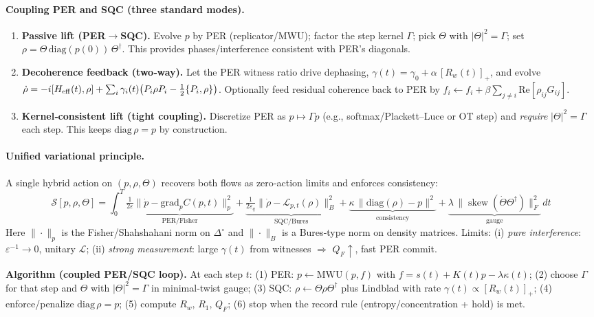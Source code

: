 \documentclass[11pt]{article}
\begin{document}
\paragraph{Coupling PER and SQC (three standard modes).}
\begin{enumerate}[leftmargin=1.05em,itemsep=2pt,topsep=2pt]
\item \textbf{Passive lift (PER$\rightarrow$SQC).} Evolve $p$ by PER (replicator/MWU); factor the step kernel $\Gamma$; pick $\Theta$ with $|\Theta|^2=\Gamma$; set $\rho=\Theta\,\mathrm{diag}(p(0))\,\Theta^\dagger$. This provides phases/interference consistent with PER’s diagonals.
\item \textbf{Decoherence feedback (two‑way).} Let the PER witness ratio drive dephasing,
$\gamma(t)=\gamma_0+\alpha\,[R_w(t)]_+$,
and evolve
$\dot\rho=-i[H_{\rm eff}(t),\rho]+\sum_i\gamma_i(t)\big(P_i\rho P_i-\tfrac12\{P_i,\rho\}\big)$.
Optionally feed residual coherence back to PER by $f_i \leftarrow f_i + \beta \sum_{j\ne i}\mathrm{Re}[\rho_{ij}G_{ij}]$.
\item \textbf{Kernel‑consistent lift (tight coupling).} Discretize PER as $p\mapsto \Gamma p$ (e.g., softmax/Plackett–Luce or OT step) and \emph{require} $|\Theta|^2=\Gamma$ each step. This keeps $\mathrm{diag}\,\rho=p$ by construction.
\end{enumerate}

\paragraph{Unified variational principle.}
A single hybrid action on $(p,\rho,\Theta)$ recovers both flows as zero‑action limits and enforces consistency:
\[
\boxed{\;
\mathcal{S}[p,\rho,\Theta]=\!\int_0^T
\underbrace{\tfrac{1}{2\varepsilon}\big\|\dot p-\mathrm{grad}_p C(p,t)\big\|_{p}^{2}}_{\text{PER/Fisher}}
+\underbrace{\tfrac{1}{2\varepsilon_q}\big\|\dot\rho-\mathcal{L}_{p,t}(\rho)\big\|_{B}^{2}}_{\text{SQC/Bures}}
+\underbrace{\kappa\,\|\mathrm{diag}(\rho)-p\|^2}_{\text{consistency}}
+\underbrace{\lambda\,\|\operatorname{skew}(\dot\Theta\Theta^\dagger)\|_F^2}_{\text{gauge}}
\,dt\; }
\]
Here $\|\cdot\|_p$ is the Fisher/Shahshahani norm on $\Delta^\circ$ and $\|\cdot\|_B$ is a Bures‑type norm on density matrices.
Limits: (i) \emph{pure interference}: $\varepsilon^{-1}\!\to 0$, unitary $\mathcal{L}$; (ii) \emph{strong measurement}: large $\gamma(t)$ from witnesses $\Rightarrow$ $Q_F\uparrow$, fast PER commit.

\begin{framed}\small
\textbf{Algorithm (coupled PER/SQC loop).}
At each step $t$: (1) PER: $p\!\leftarrow\!\mathrm{MWU}(p,f)$ with $f=s(t)+K(t)p-\lambda\kappa(t)$; (2) choose $\Gamma$ for that step and $\Theta$ with $|\Theta|^2=\Gamma$ in minimal‑twist gauge; (3) SQC: $\rho\!\leftarrow\!\Theta\rho\Theta^\dagger$ plus Lindblad with rate $\gamma(t)\propto [R_w(t)]_+$; (4) enforce/penalize $\mathrm{diag}\,\rho=p$; (5) compute $R_w,\,R_1,\,Q_F$; (6) stop when the record rule (entropy/concentration + hold) is met.
\end{framed}
\end{document}

